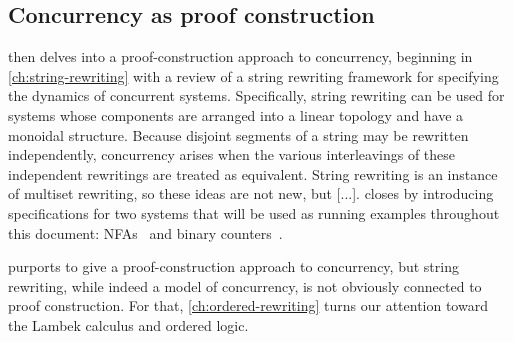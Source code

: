 \subsection{Concurrency as proof construction}

 then delves into a proof-construction approach to concurrency, beginning in \cref{ch:string-rewriting} with a review of a string rewriting framework for specifying the dynamics of concurrent systems.
Specifically, string rewriting can be used for systems whose components are arranged into a linear topology and have a monoidal structure.
Because 
disjoint segments of a string may be rewritten independently,
concurrency arises when the various interleavings of these independent rewritings are treated as equivalent.
String rewriting is an instance of multiset rewriting, so these ideas are not new, but [...].\autocite{Meseguer:TCS92}
 closes by introducing
specifications for two systems that will be used as running examples throughout this document: \aclp*{NFA}~ and binary counters~.

 purports to give a proof-construction approach to concurrency, but string rewriting, while indeed a model of concurrency, is not obviously connected to proof construction.
For that, \cref{ch:ordered-rewriting} turns our attention toward the Lambek calculus and ordered logic.

